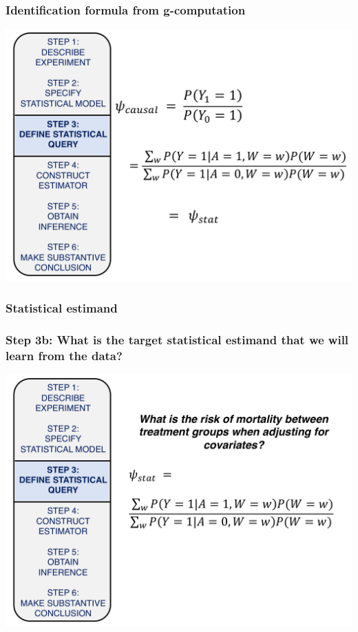 \documentclass[t]{beamer}
\begin{document}
\begin{frame}
  \frametitle{Identification formula from g-computation}
  \vspace{-20pt}
  \begin{center}
  \includegraphics[width = 1.05\textwidth]{figures/Gcomp.pdf}
  \end{center}
\end{frame}

\subsubsection{Statistical estimand}
\begin{frame}
  \frametitle{Step 3b: What is the target statistical estimand that we will learn from the data?}
  \vspace{-20pt}
  \begin{center}
  \includegraphics[width = 1.05\textwidth]{figures/stat_estimand.pdf}
  \end{center}
\end{frame}
\end{document}
